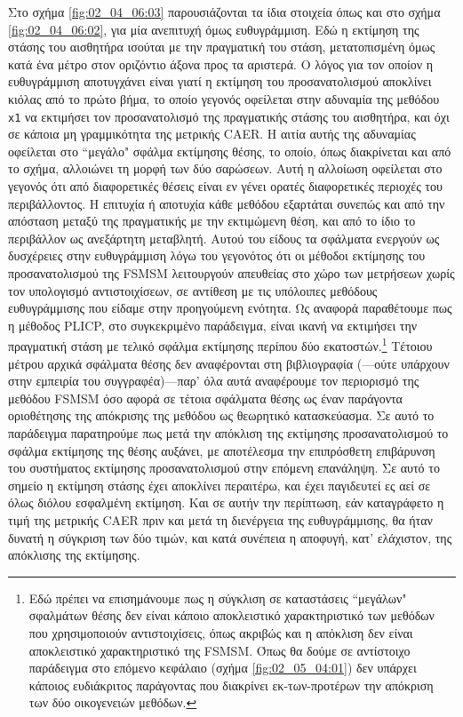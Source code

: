 Στο σχήμα \ref{fig:02_04_06:03} παρουσιάζονται τα ίδια στοιχεία όπως και στο
σχήμα \ref{fig:02_04_06:02}, για μία ανεπιτυχή όμως ευθυγράμμιση. Εδώ η
εκτίμηση της στάσης του αισθητήρα ισούται με την πραγματική του στάση,
μετατοπισμένη όμως κατά ένα μέτρο στον οριζόντιο άξονα προς τα αριστερά. Ο
λόγος για τον οποίον η ευθυγράμμιση αποτυγχάνει είναι γιατί η εκτίμηση του
προσανατολισμού αποκλίνει κιόλας από το πρώτο βήμα, το οποίο γεγονός οφείλεται
στην αδυναμία της μεθόδου \texttt{x1} να εκτιμήσει τον προσανατολισμό της
πραγματικής στάσης του αισθητήρα, και όχι σε κάποια μη γραμμικότητα της
μετρικής CAER. Η αιτία αυτής της αδυναμίας οφείλεται στο ``μεγάλο" σφάλμα
εκτίμησης θέσης, το οποίο, όπως διακρίνεται και από το σχήμα, αλλοιώνει τη
μορφή των δύο σαρώσεων. Αυτή η αλλοίωση οφείλεται στο γεγονός ότι από
διαφορετικές θέσεις είναι εν γένει ορατές διαφορετικές περιοχές του
περιβάλλοντος.  Η επιτυχία ή αποτυχία κάθε μεθόδου εξαρτάται συνεπώς και από
την απόσταση μεταξύ της πραγματικής με την εκτιμώμενη θέση, και από το ίδιο το
περιβάλλον ως ανεξάρτητη μεταβλητή.  Αυτού του είδους τα σφάλματα ενεργούν ως
δυσχέρειες στην ευθυγράμμιση λόγω του γεγονότος ότι οι μέθοδοι εκτίμησης του
προσανατολισμού της FSMSM λειτουργούν απευθείας στο χώρο των μετρήσεων χωρίς
τον υπολογισμό αντιστοιχίσεων, σε αντίθεση με τις υπόλοιπες μεθόδους
ευθυγράμμισης που είδαμε στην προηγούμενη ενότητα. Ως αναφορά παραθέτουμε πως η
μέθοδος PLICP, στο συγκεκριμένο παράδειγμα, είναι ικανή να εκτιμήσει την
πραγματική στάση με τελικό σφάλμα εκτίμησης περίπου δύο εκατοστών.\footnote{Εδώ
πρέπει να επισημάνουμε πως η σύγκλιση σε καταστάσεις ``μεγάλων" σφαλμάτων θέσης
δεν είναι κάποιο αποκλειστικό χαρακτηριστικό των μεθόδων που χρησιμοποιούν
αντιστοιχίσεις, όπως ακριβώς και η απόκλιση δεν είναι αποκλειστικό
χαρακτηριστικό της FSMSM.  Όπως θα δούμε σε αντίστοιχο παράδειγμα στο επόμενο
κεφάλαιο (σχήμα \ref{fig:02_05_04:01}) δεν υπάρχει κάποιος ευδιάκριτος
παράγοντας που διακρίνει εκ-των-προτέρων την απόκριση των δύο οικογενειών
μεθόδων.} Τέτοιου μέτρου αρχικά σφάλματα θέσης δεν αναφέρονται στη βιβλιογραφία
(---ούτε υπάρχουν στην εμπειρία του συγγραφέα)---παρ' όλα αυτά αναφέρουμε τον
περιορισμό της μεθόδου FSMSM όσο αφορά σε τέτοια σφάλματα θέσης ως έναν
παράγοντα οριοθέτησης της απόκρισης της μεθόδου ως θεωρητικό κατασκεύασμα. Σε
αυτό το παράδειγμα παρατηρούμε πως μετά την απόκλιση της εκτίμησης
προσανατολισμού το σφάλμα εκτίμησης της θέσης αυξάνει, με αποτέλεσμα την
επιπρόσθετη επιβάρυνση του συστήματος εκτίμησης προσανατολισμού στην επόμενη
επανάληψη. Σε αυτό το σημείο η εκτίμηση στάσης έχει αποκλίνει περαιτέρω, και
έχει παγιδευτεί ες αεί σε όλως διόλου εσφαλμένη εκτίμηση. Και σε αυτήν την
περίπτωση, εάν καταγράφετο η τιμή της μετρικής CAER πριν και μετά τη διενέργεια
της ευθυγράμμισης, θα ήταν δυνατή η σύγκριση των δύο τιμών, και κατά συνέπεια η
αποφυγή, κατ' ελάχιστον, της απόκλισης της εκτίμησης.

